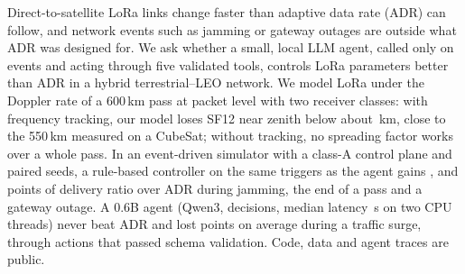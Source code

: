 Direct-to-satellite LoRa links change faster than adaptive data rate (ADR) can follow, and network
events such as jamming or gateway outages are outside what ADR was designed for. We ask whether a small,
local LLM agent, called only on events and acting through five validated tools, controls LoRa
parameters better than ADR in a hybrid terrestrial--LEO network. We model LoRa under the Doppler
rate of a 600\,km pass at packet level with two receiver classes: with frequency tracking, our
model loses SF12 near zenith below about \EtwoBSFtwelveZenithFrom\,km, close to the 550\,km measured
on a CubeSat; without tracking, no spreading factor works over a whole pass. In an event-driven
simulator with a class-A control plane and paired seeds, a rule-based controller on the same
triggers as the agent gains \SOneDiffRules, \SThreeDiffRules{} and \SFourDiffRules{} points of
delivery ratio over ADR during jamming, the end of a pass and a gateway outage. A 0.6B agent
(Qwen3, \AgentDecisions{} decisions, median latency \AgentLatMed\,s on two CPU threads) never beat
ADR and lost \SFiveDiffAgent{} points on average during a traffic surge, through actions that passed
schema validation. Code, data and agent traces are public.
